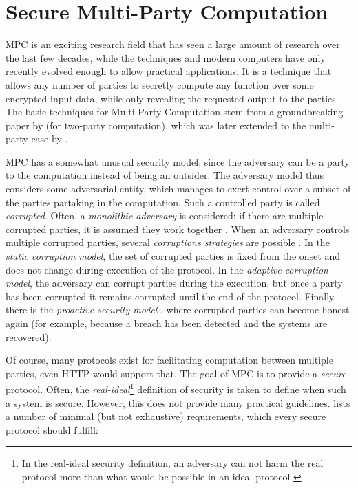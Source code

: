 \section{Secure Multi-Party Computation}
\label{sec:mpc}
\gls{MPC} is an exciting research field that has seen a large amount of research over the last few decades, while the techniques and modern computers have only recently evolved enough to allow practical applications. It is a technique that allows any number of parties to secretly compute any function over some encrypted input data, while only revealing the requested output to the parties. The basic techniques for Multi-Party Computation stem from a groundbreaking paper by \citet{yao} (for two-party computation), which was later extended to the multi-party case by \citet{mpc}.

\gls{MPC} has a somewhat unusual security model, since the adversary can be a party to the computation instead of being an outsider. The adversary model thus considers some adversarial entity, which manages to exert control over a subset of the parties partaking in the computation. Such a controlled party is called \textit{corrupted}. Often, a \textit{monolithic adversary} is considered: if there are multiple corrupted parties, it is assumed they work together \citep{mpc-good-practice}. When an adversary controls multiple corrupted parties, several \textit{corruptions strategies} are possible \citep{secure-mpc}. In the \textit{static corruption model}, the set of corrupted parties is fixed from the onset and does not change during execution of the protocol. In the \textit{adaptive corruption model}, the adversary can corrupt parties during the execution, but once a party has been corrupted it remains corrupted until the end of the protocol. Finally, there is the \textit{proactive security model} \citep{sec-transient-failures}, where corrupted parties can become honest again (for example, because a breach has been detected and the systems are recovered).

Of course, many protocols exist for facilitating computation between multiple parties, even HTTP would support that. The goal of \gls{MPC} is to provide a \textit{secure} protocol. Often, the \textit{real-ideal}\footnote{In the real-ideal security definition, an adversary can not harm the real protocol more than what would be possible in an ideal protocol \citep{mpc}} definition of security is taken to define when such a system is secure. However, this does not provide many practical guidelines. \citet{secure-mpc} lists a number of minimal (but not exhaustive) requirements, which every secure protocol should fulfill:


